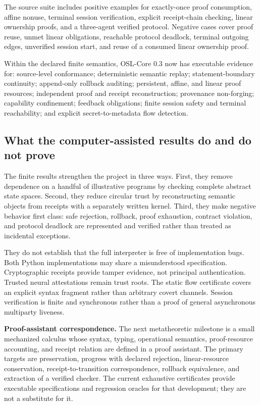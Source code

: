 The source suite includes positive examples for exactly-once proof consumption, affine nonuse, terminal session verification, explicit receipt-chain checking, linear ownership proofs, and a three-agent verified protocol.  Negative cases cover proof reuse, unmet linear obligations, reachable protocol deadlock, terminal outgoing edges, unverified session start, and reuse of a consumed linear ownership proof.

\begin{provedbox}
Within the declared finite semantics, OSL-Core 0.3 now has executable evidence for: source-level conformance; deterministic semantic replay; statement-boundary continuity; append-only rollback auditing; persistent, affine, and linear proof resources; independent proof and receipt reconstruction; provenance non-forging; capability confinement; feedback obligations; finite session safety and terminal reachability; and explicit secret-to-metadata flow detection.
\end{provedbox}

\subsection{What the computer-assisted results do and do not prove}

The finite results strengthen the project in three ways.  First, they remove dependence on a handful of illustrative programs by checking complete abstract state spaces.  Second, they reduce circular trust by reconstructing semantic objects from receipts with a separately written kernel.  Third, they make negative behavior first class: safe rejection, rollback, proof exhaustion, contract violation, and protocol deadlock are represented and verified rather than treated as incidental exceptions.

They do not establish that the full interpreter is free of implementation bugs.  Both Python implementations may share a misunderstood specification.  Cryptographic receipts provide tamper evidence, not principal authentication.  Trusted neural attestations remain trust roots.  The static flow certificate covers an explicit syntax fragment rather than arbitrary covert channels.  Session verification is finite and synchronous rather than a proof of general asynchronous multiparty liveness.

\begin{placeholderbox}
\textbf{Proof-assistant correspondence.}  The next metatheoretic milestone is a small mechanized calculus whose syntax, typing, operational semantics, proof-resource accounting, and receipt relation are defined in a proof assistant.  The primary targets are preservation, progress with declared rejection, linear-resource conservation, receipt-to-transition correspondence, rollback equivalence, and extraction of a verified checker.  The current exhaustive certificates provide executable specifications and regression oracles for that development; they are not a substitute for it.
\end{placeholderbox}

